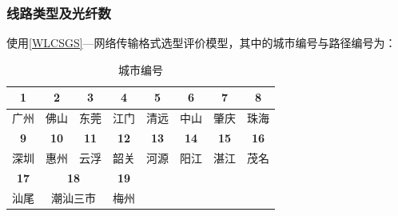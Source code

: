 \documentclass[UTF8,12pt]{ctexart}
\begin{document}
        \subsubsection{线路类型及光纤数}
            使用\ref{WLCSGS}—网络传输格式选型评价模型，其中的城市编号与路径编号为：
      \begin{table}[htbp]
        \centering
        \caption{城市编号}
          \begin{tabular}{cccccccc}
          \toprule
          \multicolumn{1}{c}{\textbf{1}} & \multicolumn{1}{c}{\textbf{2}} & \textbf{3} & \multicolumn{1}{c}{\textbf{4}} & \textbf{5} & \textbf{6} & \textbf{7} & \textbf{8} \\
          \midrule
          广州     & 佛山     & \multicolumn{1}{c}{东莞} & 江门     & \multicolumn{1}{c}{清远} & \multicolumn{1}{c}{中山} & \multicolumn{1}{c}{肇庆} & \multicolumn{1}{c}{珠海} \\
          \midrule
          \multicolumn{1}{c}{\textbf{9}} & \multicolumn{1}{c}{\textbf{10}} & \textbf{11} & \multicolumn{1}{c}{\textbf{12}} & \textbf{13} & \textbf{14} & \textbf{15} & \textbf{16} \\
          \midrule
          深圳     & 惠州     & \multicolumn{1}{c}{云浮} & 韶关     & \multicolumn{1}{c}{河源} & \multicolumn{1}{c}{阳江} & \multicolumn{1}{c}{湛江} & \multicolumn{1}{c}{茂名} \\
          \midrule
          \multicolumn{1}{c}{\textbf{17}} & \multicolumn{2}{c}{\textbf{18}} & \multicolumn{1}{c}{\textbf{19}} &        &        &        &  \\
          \midrule
          汕尾     & \multicolumn{2}{c}{潮汕三市} & 梅州     &        &        &        &  \\
          \bottomrule
          \end{tabular}%
      \end{table}%
\end{document}
